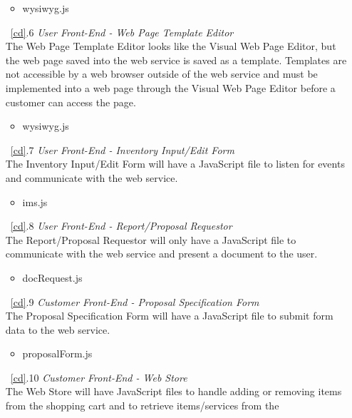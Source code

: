 \documentclass{article}
\newcommand{\br}{\vspace{2mm}}
\begin{document}
\begin{enumerate}
\begin{itemize}
            \item wysiwyg.js
        \end{itemize}
    \item[~\ref{cd}.6 ] \emph{User Front-End - Web Page Template Editor}\br\\
        The Web Page Template Editor looks like the Visual Web Page Editor, but
        the web page saved into the web service is saved as a template.  Templates
        are not accessible by a web browser outside of the web service and must be implemented
        into a web page through the Visual Web Page Editor before a customer can
        access the page.
        \begin{itemize}
            \item wysiwyg.js
        \end{itemize}
    \item[~\ref{cd}.7 ] \emph{User Front-End - Inventory Input/Edit Form}\br\\
        The Inventory Input/Edit Form will have a JavaScript file to listen for
        events and communicate with the web service.
        \begin{itemize}
            \item ims.js
        \end{itemize}
    \item[~\ref{cd}.8 ] \emph{User Front-End - Report/Proposal Requestor}\br\\
        The Report/Proposal Requestor will only have a JavaScript file to
        communicate with the web service and present a document to the user.
        \begin{itemize}
            \item docRequest.js
        \end{itemize}
    \item[~\ref{cd}.9 ] \emph{Customer Front-End - Proposal Specification Form}\br\\
        The Proposal Specification Form will have a JavaScript file to submit
        form data to the web service.
        \begin{itemize}
            \item proposalForm.js
        \end{itemize}
    \item[~\ref{cd}.10 ] \emph{Customer Front-End - Web Store}\br\\
        The Web Store will have JavaScript files to handle adding or removing
        items from the shopping cart and to retrieve items/services from the

\end{enumerate}
\end{document}
